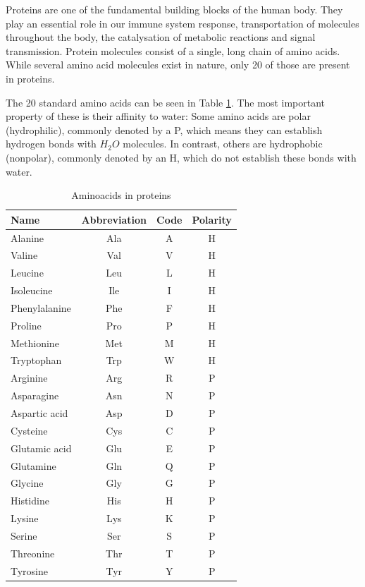 Proteins are one of the fundamental building blocks of the human body. They play an essential role in our immune system response, transportation of molecules throughout the body, the catalysation of metabolic reactions and signal transmission. Protein molecules consist of a single, long chain of amino acids. While several amino acid molecules exist in nature, only 20 of those are present in proteins.

The 20 standard amino acids can be seen in Table \ref{aminoacids20}. The most important property of these is their affinity to water: Some amino acids are polar (hydrophilic), commonly denoted by a P, which means they can establish hydrogen bonds with $H_2O$ molecules. In contrast, others are hydrophobic (nonpolar), commonly denoted by an H, which do not establish these bonds with water.

\begin{table}[H]
\centering
\begin{tabular}{|l|ccc|}
\hline
Name          & Abbreviation & Code & Polarity \\
\hline
Alanine       & Ala & A & H \\
Valine        & Val & V & H \\
Leucine       & Leu & L & H \\
Isoleucine    & Ile & I & H \\
Phenylalanine & Phe & F & H \\
Proline       & Pro & P & H \\
Methionine    & Met & M & H \\
Tryptophan    & Trp & W & H \\
\hline
Arginine      & Arg & R & P \\
Asparagine    & Asn & N & P \\
Aspartic acid & Asp & D & P \\
Cysteine      & Cys & C & P \\
Glutamic acid & Glu & E & P \\
Glutamine     & Gln & Q & P \\
Glycine       & Gly & G & P \\
Histidine     & His & H & P \\
Lysine        & Lys & K & P \\
Serine        & Ser & S & P \\
Threonine     & Thr & T & P \\
Tyrosine      & Tyr & Y & P \\
\hline
\end{tabular}
\caption{Aminoacids in proteins}
\label{aminoacids20}
\end{table}

